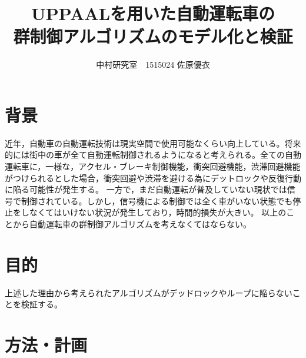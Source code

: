 \documentclass[twocolumn]{jsarticle}
\begin{document}
\title{UPPAALを用いた自動運転車の\\群制御アルゴリズムのモデル化と検証}
\author{中村研究室　1515024 佐原優衣}
\maketitle

\section{背景}
近年，自動車の自動運転技術は現実空間で使用可能なくらい向上している。将来的には街中の車が全て自動運転制御されるようになると考えられる。全ての自動運転車に，一様な，アクセル・ブレーキ制御機能，衝突回避機能，渋滞回避機能がつけられるとした場合，衝突回避や渋滞を避ける為にデットロックや反復行動に陥る可能性が発生する。
一方で，まだ自動運転が普及していない現状では信号で制御されている。しかし，信号機による制御では全く車がいない状態でも停止をしなくてはいけない状況が発生しており，時間的損失が大きい。
以上のことから自動運転車の群制御アルゴリズムを考えなくてはならない。

\section{目的}
上述した理由から考えられたアルゴリズムがデッドロックやループに陥らないことを検証する。
\section{方法・計画}
\end{document}
